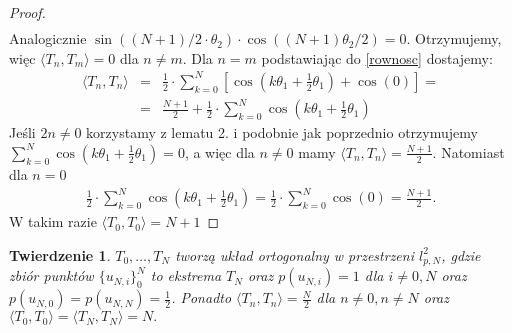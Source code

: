 \documentclass[12pt,wide]{mwart}
\newtheorem{tw}{Twierdzenie}
\begin{document}
\begin{proof}
\begin{eqnarray*}
\end{eqnarray*}
Analogicznie $ \sin((N+1)/2 \cdot \theta_2) \cdot \cos((N+1)\theta_2 /2) = 0$. Otrzymujemy, więc $\langle T_n,T_m \rangle = 0$ dla $n \neq m$.
Dla $n=m$ podstawiając do \ref{rownosc} dostajemy:
\begin{eqnarray*}
\langle T_n,T_n \rangle &=&  \frac{1}{2} \cdot \sum_{k=0}^N [\cos(k\theta_1 + \frac{1}{2}\theta_1) + \cos(0)] = \\ &=& \frac{N+1}{2} + \frac{1}{2} \cdot \sum_{k=0}^N \cos(k\theta_1 + \frac{1}{2}\theta_1)   
\end{eqnarray*}
Jeśli $2n \neq 0$ korzystamy z lematu 2. i podobnie jak poprzednio otrzymujemy $\sum_{k=0}^N \cos(k\theta_1 + \frac{1}{2}\theta_1) = 0$, a więc dla $n \neq 0$ mamy $\langle T_n,T_n \rangle = \frac{N+1}{2}$. Natomiast dla $ n=0$
\begin{eqnarray*}
\frac{1}{2} \cdot \sum_{k=0}^N \cos(k\theta_1 + \frac{1}{2}\theta_1) = \frac{1}{2} \cdot \sum_{k=0}^N \cos(0) = \frac{N+1}{2}.
\end{eqnarray*}
W takim razie $\langle T_0,T_0 \rangle = N+1$
\end{proof}

\begin{tw} $T_0,\ldots,T_N$ tworzą układ ortogonalny w przestrzeni $l^2_{p,N}$, gdzie zbiór punktów $\{u_{N,i}\}_0^N$ to ekstrema $T_{N}$ oraz $p(u_{N,i}) = 1$ dla $i \neq 0,N$ oraz $p(u_{N,0}) = p(u_{N,N}) = \frac{1}{2}$. Ponadto $\langle T_n,T_n \rangle = \frac{N}{2}$ dla $n \neq 0, n \neq N$ oraz $\langle T_0,T_0 \rangle = \langle T_N,T_N \rangle = N.$  
\end{tw}
\end{document}
